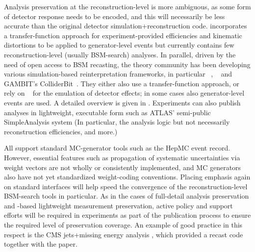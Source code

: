 \documentclass[11pt]{article}
\begin{document}
Analysis preservation at the reconstruction-level is 
more ambiguous, as some form of detector response needs to be encoded, and this will necessarily be less accurate than the original detector simulation+reconstruction code. \rivet incorporates a transfer-function approach for experiment-provided efficiencies and kinematic distortions to be applied to generator-level events but currently contains few reconstruction-level (usually BSM-search) analyses.
In parallel, driven by the need of open access to BSM recasting, the theory community has been developing various simulation-based reinterpretation frameworks, in particular \checkmate~\cite{Drees:2013wra,Dercks:2016npn}, \madanalysis~\cite{Dumont:2014tja,Conte:2018vmg} and GAMBIT's ColliderBit~\cite{GAMBIT:2017qxg}.  They either also use a transfer-function approach, or rely on \delphes~\cite{deFavereau:2013fsa} for the emulation of detector effects; in some cases also generator-level events are used. A detailed overview is given in \cite{LHCReinterpretationForum:2020xtr}.  
Experiments can also publish analyses in lightweight, executable form such as ATLAS' semi-public SimpleAnalysis system %
(In particular, the analysis logic but not necessarily reconstruction efficiencies, and more.)
%

All support standard MC-generator tools such as the HepMC event record. However, essential features such as propagation of systematic uncertainties via weight vectors are not wholly or consistently implemented, and MC generators also have not yet standardized weight-coding conventions. Placing emphasis again on standard interfaces will help speed the convergence of the reconstruction-level BSM-search tools in particular. As in the cases of full-detail analysis preservation and \rivet-based lightweight measurement preservation, active policy and support efforts will be required in experiments as part of the publication process to ensure the required level of preservation coverage.
%
An example of good practice in this respect is the CMS jets+missing energy analysis \cite{CMS:2021far}, which provided a \madanalysis recast code \cite{Albert:2774586,DVN/IRF7ZL_2021} together with the paper.
\end{document}
